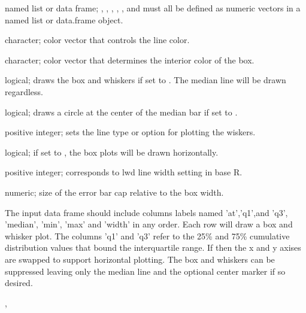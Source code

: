 \documentclass[a4paper]{book}
\begin{document}
\begin{Arguments}
\begin{ldescription}
\item[\code{x}] named list or data frame; , , , , ,  and  must all be defined as numeric vectors in a named list or data.frame object.

\item[\code{col}] character; color vector that controls the line color.

\item[\code{fill}] character; color vector that determines the interior color of the box.

\item[\code{drawBox}] logical; draws the box and whiskers if set to . The median line will be drawn regardless.

\item[\code{drawDot}] logical; draws a circle at the center of the median bar if set to .

\item[\code{whiskerLty}] positive integer; sets the line type or  option for plotting the wiskers.

\item[\code{side}] logical; if set to , the box plots will be drawn horizontally.

\item[\code{lWidth}] positive integer; corresponds to lwd line width setting in base R.

\item[\code{capWidth}] numeric; size of the error bar cap relative to the box width.
\end{ldescription}
\end{Arguments}
%
\begin{Details}\relax
The input data frame  should include columns labels named 'at','q1',and 'q3', 'median', 'min', 'max' and 'width' in any order.
Each row will draw a box and whisker plot. The columns 'q1' and 'q3' refer to the 25\% and 75\% cumulative distribution values that bound the interquartile range.
If  then the x and y axises are swapped to support horizontal plotting. The box and whiskers can be suppressed leaving only the median line and the optional center marker if so desired.
\end{Details}
%
\begin{SeeAlso}\relax
{}, 
\end{SeeAlso}
\end{document}
